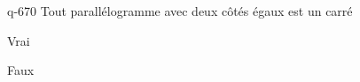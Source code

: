 \begin{truefalse}{q-670}
 Tout parallélogramme avec deux côtés égaux est un carré
\item Vrai
\item* Faux
\end{truefalse}


